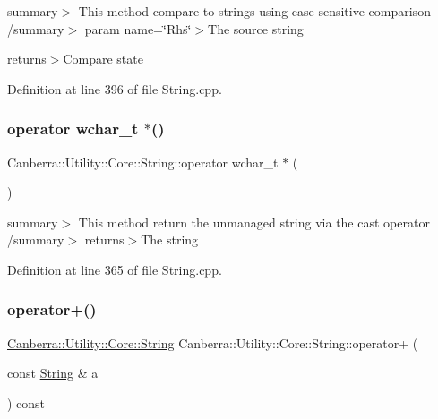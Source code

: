 summary$>$ This method compare to strings using case sensitive comparison /summary$>$ param name=\char`\"{}\+Rhs\char`\"{}$>$The source string

returns$>$Compare state

Definition at line 396 of file String.\+cpp.

\mbox{\label{class_canberra_1_1_utility_1_1_core_1_1_string_a42e22a448574aabe6824798e5f028748_a42e22a448574aabe6824798e5f028748}} 
\subsubsection{\texorpdfstring{operator wchar\+\_\+t $\ast$()}{operator wchar\_t *()}}
{\footnotesize\ttfamily Canberra\+::\+Utility\+::\+Core\+::\+String\+::operator wchar\+\_\+t $\ast$ (\begin{DoxyParamCaption}{ }\end{DoxyParamCaption})}

summary$>$ This method return the unmanaged string via the cast operator /summary$>$ returns$>$The string

Definition at line 365 of file String.\+cpp.

\mbox{\label{class_canberra_1_1_utility_1_1_core_1_1_string_ae036c54a6eac8bd2e7793743fa192117_ae036c54a6eac8bd2e7793743fa192117}} 
\subsubsection{\texorpdfstring{operator+()}{operator+()}}
{\footnotesize\ttfamily \hyperlink{class_canberra_1_1_utility_1_1_core_1_1_string}{Canberra\+::\+Utility\+::\+Core\+::\+String} Canberra\+::\+Utility\+::\+Core\+::\+String\+::operator+ (\begin{DoxyParamCaption}\item[{const \hyperlink{class_canberra_1_1_utility_1_1_core_1_1_string}{String} \&}]{a }\end{DoxyParamCaption}) const}

